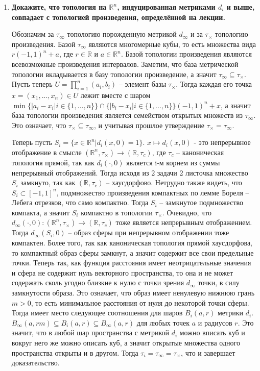 \documentclass{article}
\begin{document}
\begin{enumerate}
    \item \textbf{Докажите, что топология на $\mathbb{R}^n$, индуцированная
        метриками $d_i$ и выше, совпадает с топологией произведения,
        определённой на лекции.}\par
        Обозначим за $\tau_\infty$ топологию порожденную метрикой $d_\infty$
        и за $\tau_\times$ топологию произведения. Базой $\tau_\infty$ являются
        многомерные кубы, то есть множества вида $r(-1,1)^n+a$, где $r\in
        \mathbb{R}$ и $a\in\mathbb{R}^n$. Базой топологии произведения
        являются всевозможные произведения интервалов. Заметим, что база
        метрической топологии вкладывается в базу топологии произведение, а
        значит $\tau_\infty\subseteq\tau_\times$. Пусть теперь $U=\prod_{i=1}^n
        (a_i,b_i)$ – элемент базы $\tau_\times$. Тогда каждая его точка $x=(x_1
        ,...,x_n)\in U$ лежит вместе с шаром $\min\{|a_i-x_i|i\in\{1,...,n\}\}
        \cap\{|b_i-x_i|i\in\{1,...,n\}\}(-1,1)^n+x$, а значит база топологии
        произведения является семейством открытых множеств из $\tau_\infty$.
        Это означает, что $\tau_\times\subseteq\tau_\infty$, и учитывая прошлое
        утверждение $\tau_\times=\tau_\infty$.\par

        Теперь пусть $S_i=\{x\in\mathbb{R}^n|d_i(x,0)=1\}$. $x\mapsto d_i(x,0)$ -
        это непрерывное отображение в смысле $(\mathbb{R}^n,\tau_\times)
        \longrightarrow(\mathbb{R},\tau_c)$, где $\tau_c$ – каноническая
        топология прямой, так как $d_i(\cdot,0)$ является i-м корнем из суммы
        непрерывный отображений. Тогда исходя из 2 задачи 2 листочка множество 
        $S_i$ замкнуто, так как $(\mathbb{R},\tau_c)$ – хаусдорфово.
        Нетрудно также видеть, что $S_i\subset[-1,1]^n$, подмножество
        произведения компактных по лемме Бореля – Лебега отрезков, что само
        компактно. Тогда $S_i$ – замкнутое подмножество компакта, а значит
        $S_i$ компактно в топологии $\tau_\times$. Очевидно, что $d_\infty(
        \cdot, 0):(\mathbb{R}^n,\tau_\times)\longrightarrow(\mathbb{R},\tau_c)$
        тоже является непрерывным отображением. Тогда $d_\infty(S_i,0)$ – образ
        сферы при непрерывном отображении тоже компактен. Более того, так как
        каноническая топология прямой хаусдорфова, то компактный образ сферы
        замкнут, а значит содержит все свои предельные точки. Теперь так, как
        функция расстояния имеет неотрицательные значения и сфера не содержит
        нуль векторного пространства, то она и не может содержать сколь угодно
        близкие к нулю с точки зрения $d_\infty$ точки, в силу замкнутости
        образа. Это означает, что образ имеет ненулевую нижнюю грань $m>0$,
        то есть минимальное расстояния от нуля до некоторой точки сферы. Тогда
        имеет место следующее соотношения для шаров $B_i(a,r)$ метрики $d_i$.
        $B_\infty(a,rm)\subseteq B_i(a,r)\subseteq B_\infty(a,r)$ для любых
        точек $a$ и радиусов $r$. Это значит, что в любой шар пространства с
        метрикой $d_i$ можно вписать куб и вокруг него же можно описать куб,
        а значит открытые множества одного пространства открыты и в другом.
        Тогда $\tau_i=\tau_\infty=\tau_\times$, что и завершает доказательство.


\end{enumerate}
\end{document}
